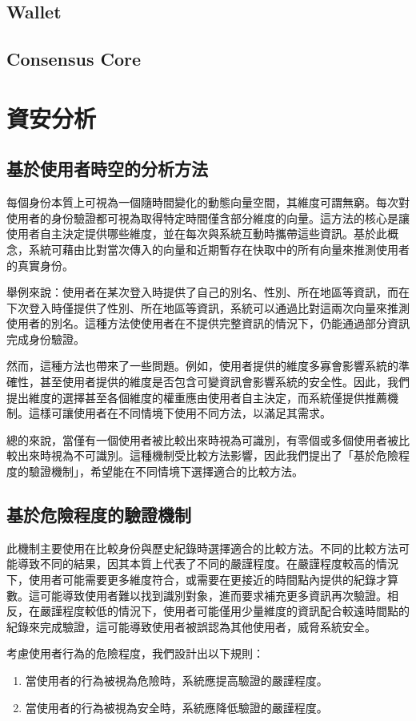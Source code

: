 \subsection{Wallet}
\subsection{Consensus Core}
\section{資安分析}
\subsection{基於使用者時空的分析方法}
每個身份本質上可視為一個隨時間變化的動態向量空間，其維度可謂無窮。每次對使用者的身份驗證都可視為取得特定時間僅含部分維度的向量。這方法的核心是讓使用者自主決定提供哪些維度，並在每次與系統互動時攜帶這些資訊。基於此概念，系統可藉由比對當次傳入的向量和近期暫存在快取中的所有向量來推測使用者的真實身份。

舉例來說：使用者在某次登入時提供了自己的別名、性別、所在地區等資訊，而在下次登入時僅提供了性別、所在地區等資訊，系統可以通過比對這兩次向量來推測使用者的別名。這種方法使使用者在不提供完整資訊的情況下，仍能通過部分資訊完成身份驗證。

然而，這種方法也帶來了一些問題。例如，使用者提供的維度多寡會影響系統的準確性，甚至使用者提供的維度是否包含可變資訊會影響系統的安全性。因此，我們提出維度的選擇甚至各個維度的權重應由使用者自主決定，而系統僅提供推薦機制。這樣可讓使用者在不同情境下使用不同方法，以滿足其需求。

總的來說，當僅有一個使用者被比較出來時視為可識別，有零個或多個使用者被比較出來時視為不可識別。這種機制受比較方法影響，因此我們提出了「基於危險程度的驗證機制」，希望能在不同情境下選擇適合的比較方法。
\subsection{基於危險程度的驗證機制}
此機制主要使用在比較身份與歷史紀錄時選擇適合的比較方法。不同的比較方法可能導致不同的結果，因其本質上代表了不同的嚴謹程度。在嚴謹程度較高的情況下，使用者可能需要更多維度符合，或需要在更接近的時間點內提供的紀錄才算數。這可能導致使用者難以找到識別對象，進而要求補充更多資訊再次驗證。相反，在嚴謹程度較低的情況下，使用者可能僅用少量維度的資訊配合較遠時間點的紀錄來完成驗證，這可能導致使用者被誤認為其他使用者，威脅系統安全。

考慮使用者行為的危險程度，我們設計出以下規則：
\begin{enumerate}
  \item 當使用者的行為被視為危險時，系統應提高驗證的嚴謹程度。
  \item 當使用者的行為被視為安全時，系統應降低驗證的嚴謹程度。
\end{enumerate}

